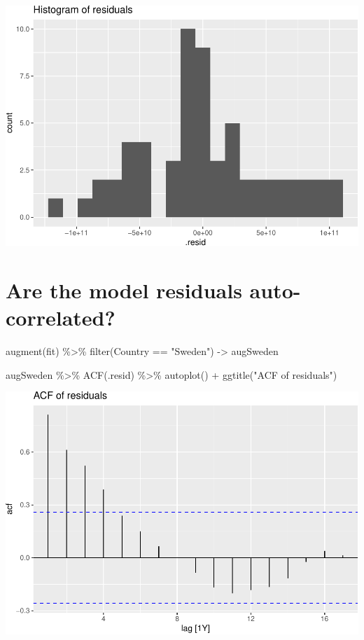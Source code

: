\documentclass[
]{book}
\newenvironment{Shaded}{\begin{snugshade}}{\end{snugshade}}
\newcommand{\FunctionTok}[1]{\textcolor[rgb]{0.00,0.00,0.00}{#1}}
\newcommand{\NormalTok}[1]{#1}
\newcommand{\OtherTok}[1]{\textcolor[rgb]{0.56,0.35,0.01}{#1}}
\newcommand{\SpecialCharTok}[1]{\textcolor[rgb]{0.00,0.00,0.00}{#1}}
\newcommand{\StringTok}[1]{\textcolor[rgb]{0.31,0.60,0.02}{#1}}
\begin{document}
\includegraphics{graphics/unnamed-chunk-70-1.pdf}

\hypertarget{are-the-model-residuals-auto-correlated-1}{%
\section{Are the model residuals auto-correlated?}\label{are-the-model-residuals-auto-correlated-1}}

\begin{Shaded}
\begin{Highlighting}[]
\FunctionTok{augment}\NormalTok{(fit) }\SpecialCharTok{\%\textgreater{}\%} \FunctionTok{filter}\NormalTok{(Country }\SpecialCharTok{==} \StringTok{"Sweden"}\NormalTok{) }\OtherTok{{-}\textgreater{}}\NormalTok{ augSweden}

\NormalTok{augSweden }\SpecialCharTok{\%\textgreater{}\%}
  \FunctionTok{ACF}\NormalTok{(.resid) }\SpecialCharTok{\%\textgreater{}\%}
  \FunctionTok{autoplot}\NormalTok{() }\SpecialCharTok{+} \FunctionTok{ggtitle}\NormalTok{(}\StringTok{"ACF of residuals"}\NormalTok{)}
\end{Highlighting}
\end{Shaded}

\includegraphics{graphics/unnamed-chunk-71-1.pdf}
\end{document}

